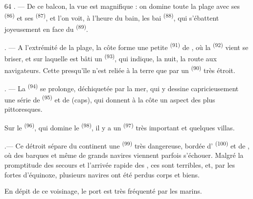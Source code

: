 \begin{VUpage}[66]{64}
. --- De ce balcon, la vue est magnifique : on\nl
domine toute la plage avec ses  \textsuperscript{(86)} et ses\nl
{} \textsuperscript{(87)}, et l'on voit, à l'heure du bain, les bai\cc
{} \textsuperscript{(88)}, qui s'ébattent joyeusement en face du\nl
{} \textsuperscript{(89)}.

. --- A l'extrémité de la plage, la côte forme une\nl
petite \textsuperscript{(91)} de , où la \textsuperscript{(92)} vient\nl
se briser, et sur laquelle est bâti un  \textsuperscript{(93)}, qui\nl
indique, la nuit, la route aux navigateurs. Cette\nl
presqu'île n'est reliée à la terre que par un \textsuperscript{(90)}\nl
très étroit.

. --- La  \textsuperscript{(94)} se prolonge, déchiquetée par\nl
la mer, qui y dessine capricieusement une série de\nl
{} \textsuperscript{(95)} et de  (caps), qui donnent\nl
à la côte un aspect des plus pittoresques.

Sur le  \textsuperscript{(96)}, qui domine le  \textsuperscript{(98)}, il y\nl
a un  \textsuperscript{(97)} très important et quelques villas.

.--- Ce détroit sépare du continent une  \textsuperscript{(99)} très\nl
dangereuse, bordée d' \textsuperscript{(100)} et de , où des\nl
barques et même de grands navires viennent parfois\nl
s'échouer. Malgré la promptitude des secours et\nl
l'arrivée rapide des , ces\nl
{} sont terribles, et, par les fortes \cc
{} d'équinoxe, plusieurs navires ont été perdus corps\nl
et biens.

En dépit de ce voisinage, le port est très fréquenté\nl
par les marins.

\VUsaut{6.0mm}
\VUfilet{22mm}
\end{VUpage}
